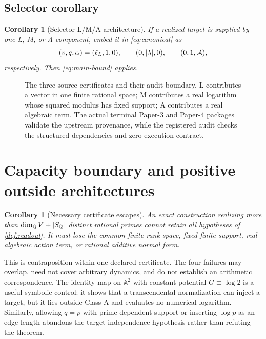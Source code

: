 \documentclass[11pt]{article}
\newtheorem{corollary}[theorem]{Corollary}
\theoremstyle{definition}
\theoremstyle{remark}
\begin{document}
\subsection{Selector corollary}

\begin{corollary}[Selector L/M/A architecture]
\label{cor:selector}
If a realized target is supplied by one L, M, or A component, embed it in
\eqref{eq:canonical} as
\[
 (v,q,\alpha)=(\ell_L,1,0),\qquad
 (0,|\lambda|,0),\qquad
 (0,1,\mathcal A),
\]
respectively.  Then \eqref{eq:main-bound} applies.
\end{corollary}

\begin{figure}[t]
  \centering
  \SourceAuditFigure
  \caption{The three source certificates and their audit boundary.  L
  contributes a vector in one finite rational space; M contributes a real
  logarithm whose squared modulus has fixed support; A contributes a real
  algebraic term.  The actual terminal Paper-3 and Paper-4 packages validate
  the upstream provenance, while the registered audit checks the structured
  dependencies and zero-execution contract.}
  \label{fig:source-audit}
\end{figure}

\section{Capacity boundary and positive outside architectures}
\label{sec:boundary}

\begin{corollary}[Necessary certificate escapes]
\label{cor:escapes}
An exact construction realizing more than $\dim_{\mathbb Q} V+|S_{\mathbb Q}|$ distinct rational
primes cannot retain all hypotheses of \cref{def:readout}.  It must lose the
common finite-rank space, fixed finite support, real-algebraic action term, or
rational additive normal form.
\end{corollary}

This is contraposition within one declared certificate.  The four failures
may overlap, need not cover arbitrary dynamics, and do not establish an
arithmetic correspondence.  The identity map on $\mathbb A^2$ with constant
potential $G\equiv\log2$ is a useful symbolic control: it shows that a
transcendental normalization can inject a target, but it lies outside Class A
and evaluates no numerical logarithm.  Similarly, allowing $q=p$ with
prime-dependent support or inserting $\log p$ as an edge length abandons the
target-independence hypothesis rather than refuting the theorem.
\end{document}
